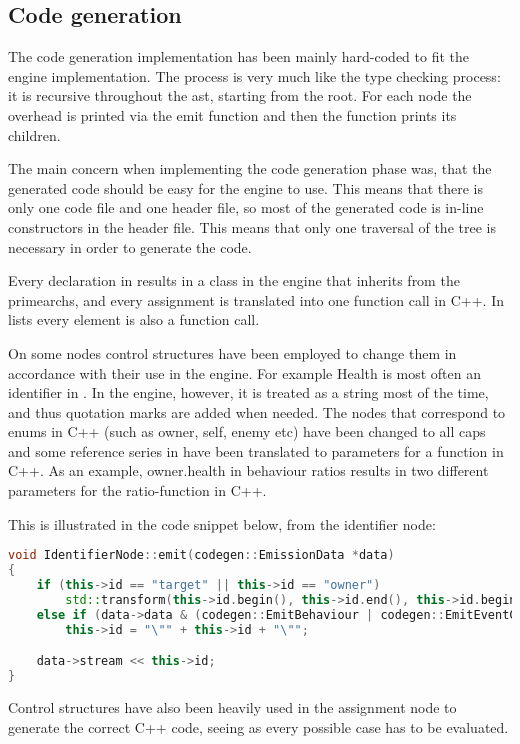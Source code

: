 \subsection{Code generation}

The code generation implementation has been mainly hard-coded to fit the engine implementation. The process is very much like the type checking process: it is recursive throughout the \ac{ast}, starting from the root. For each node the overhead is printed via the emit function and then the function prints its children. 

The main concern when implementing the code generation phase was, that the generated code should be easy for the engine to use. This means that there is only one code file and one header file, so most of the generated code is in-line constructors in the header file. This means that only one traversal of the tree is necessary in order to generate the code.

Every declaration in \langname{} results in a class in the engine that inherits from the primearchs, and every assignment is translated into one function call in C++. In lists every element is also a function call.

On some nodes control structures have been employed to change them in accordance with their use in the engine. For example Health is most often an identifier in \langname{}. In the engine, however, it is treated as a string most of the time, and thus quotation marks are added when needed. The nodes that correspond to enums in C++ (such as owner, self, enemy etc) have been changed to all caps and some reference series in \langname{} have been translated to parameters for a function in C++. As an example, owner.health in behaviour ratios results in two different parameters for the ratio-function in C++. 

This is illustrated in the code snippet below, from the identifier node:

\begin{lstlisting}[language = c++]
void IdentifierNode::emit(codegen::EmissionData *data)
{
	if (this->id == "target" || this->id == "owner")
		std::transform(this->id.begin(), this->id.end(), this->id.begin(), (int (*)(int))std::toupper);
	else if (data->data & (codegen::EmitBehaviour | codegen::EmitEventCondition))
		this->id = "\"" + this->id + "\"";

	data->stream << this->id;
}
\end{lstlisting}

Control structures have also been heavily used in the assignment node to generate the correct C++ code, seeing as every possible case has to be evaluated.


